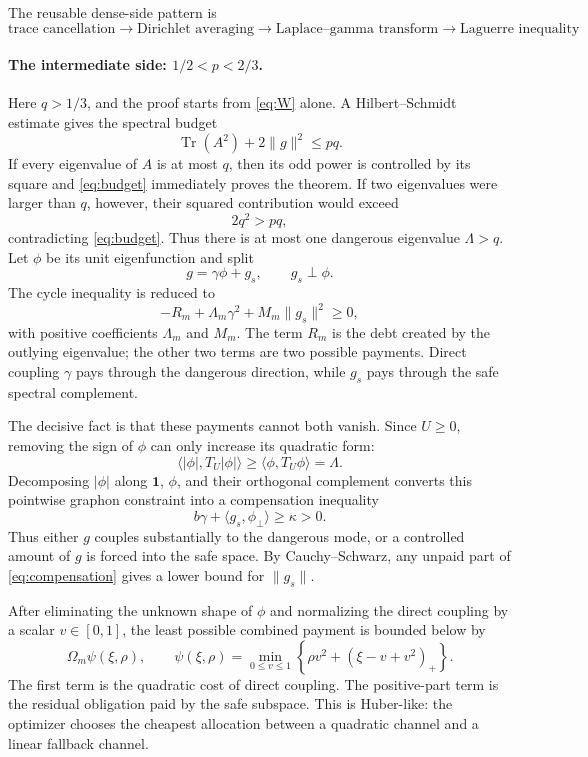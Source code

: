 \documentclass[10pt]{article}
\newcommand{\one}{\mathbf 1}
\newcommand{\ip}[2]{\langle #1,#2\rangle}
\newcommand{\norm}[1]{\lVert #1\rVert}
\newcommand{\Tr}{\operatorname{Tr}}
\newcommand{\pos}[1]{(#1)_+}
\begin{document}
The reusable dense-side pattern is
\[
  \boxed{
    \text{trace cancellation}
    \to\text{Dirichlet averaging}
    \to\text{Laplace--gamma transform}
    \to\text{Laguerre inequality}}
\]

\paragraph{The intermediate side: $1/2<p<2/3$.}
Here $q>1/3$, and the proof starts from \eqref{eq:W} alone.  A Hilbert--Schmidt estimate gives the spectral budget
\begin{equation}\label{eq:budget}
  \Tr(A^2)+2\norm{g}^2\le pq.
\end{equation}
If every eigenvalue of $A$ is at most $q$, then its odd power is controlled by its square and \eqref{eq:budget} immediately proves the theorem.  If two eigenvalues were larger than $q$, however, their squared contribution would exceed
\[
  2q^2>pq,
\]
contradicting \eqref{eq:budget}.  Thus there is at most one dangerous eigenvalue $\Lambda>q$.  Let $\phi$ be its unit eigenfunction and split
\[
  g=\gamma\phi+g_s,
  \qquad g_s\perp\phi.
\]
The cycle inequality is reduced to
\begin{equation}\label{eq:payment}
  -R_m+\Lambda_m\gamma^2+M_m\norm{g_s}^2\ge0,
\end{equation}
with positive coefficients $\Lambda_m$ and $M_m$.  The term $R_m$ is the debt created by the outlying eigenvalue; the other two terms are two possible payments.  Direct coupling $\gamma$ pays through the dangerous direction, while $g_s$ pays through the safe spectral complement.

The decisive fact is that these payments cannot both vanish.  Since $U\ge0$, removing the sign of $\phi$ can only increase its quadratic form:
\[
  \ip{|\phi|}{T_U|\phi|}\ge\ip{\phi}{T_U\phi}=\Lambda.
\]
Decomposing $|\phi|$ along $\one$, $\phi$, and their orthogonal complement converts this pointwise graphon constraint into a compensation inequality
\begin{equation}\label{eq:compensation}
  b\gamma+\ip{g_s}{\phi_\perp}\ge\kappa>0.
\end{equation}
Thus either $g$ couples substantially to the dangerous mode, or a controlled amount of $g$ is forced into the safe space.  By Cauchy--Schwarz, any unpaid part of \eqref{eq:compensation} gives a lower bound for $\norm{g_s}$.

After eliminating the unknown shape of $\phi$ and normalizing the direct coupling by a scalar $v\in[0,1]$, the least possible combined payment is bounded below by
\begin{equation}\label{eq:huber}
  \Omega_m\psi(\xi,\rho),
  \qquad
  \psi(\xi,\rho)
  =\min_{0\le v\le1}
  \left\{\rho v^2+\pos{\xi-v+v^2}\right\}.
\end{equation}
The first term is the quadratic cost of direct coupling.  The positive-part term is the residual obligation paid by the safe subspace.  This is Huber-like: the optimizer chooses the cheapest allocation between a quadratic channel and a linear fallback channel.
\end{document}
